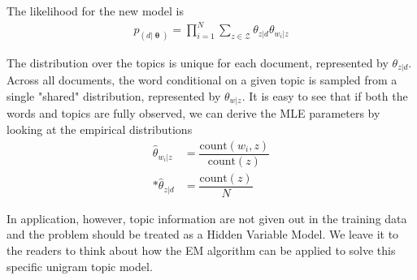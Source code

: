 \documentclass[justified, marginals=justified]{tufte-handout}
\theoremstyle{definition}
\begin{document}
\noindent The likelihood for the new model is
\begin{align*}
p_(d|\bm{\uptheta})=\prod_{i=1}^{N}\sum_{z\in\mathcal{Z}}\theta_{z|d}\theta_{w_i|z}
\end{align*}

The distribution over the topics is unique for each document, represented by $\theta_{z|d}$. Across all documents, the word conditional on a given topic is sampled from a single "shared" distribution, represented by $\theta_{w|z}$. It is easy to see that if both the words and topics are fully observed, we can derive the MLE parameters by looking at the empirical distributions
\begin{align*}
\hat{\theta}_{w_i|z} &= \dfrac{\text{count}(w_i,z)}{\text{count}(z)} \\*
\hat{\theta}_{z|d} &= \dfrac{\text{count}(z)}{N}
\end{align*}

In application, however, topic information are not given out in the training data and the problem should be treated as a Hidden Variable Model. We leave it to the readers to think about how the EM algorithm can be applied to solve this specific unigram topic model. 
\end{document}
